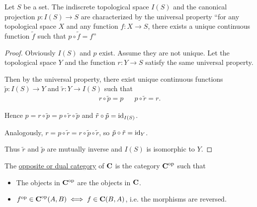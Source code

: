 \begin{example}\label{ex:indiscrete_topology_universal_property}\cite[exercise 0.10]{Leinster2014}
  Let $S$ be a set. The indiscrete topological space $I(S)$ and the canonical projection $p: I(S) \to S$ are characterized by the universal property \enquote{for any topological space $X$ and any function $f: X \to S$, there exists a unique continuous function $\tilde f$ such that $p \circ \tilde f = f$}

  \begin{figure}[ht]
    \center
  \end{figure}
\end{example}
\begin{proof}
  Obviously $I(S)$ and $p$ exist. Assume they are not unique. Let the topological space $Y$ and the function $r: Y \to S$ satisfy the same universal property.

  Then by the universal property, there exist unique continuous functions $\tilde p: I(S) \to Y$ and $\tilde r: Y \to I(S)$ such that
  \begin{align*}
    r \circ \tilde p = p
    &&
    p \circ \tilde r = r.
  \end{align*}

  Hence $p = r \circ \tilde p = p \circ \tilde r \circ \tilde p$ and $\tilde r \circ \tilde p = \operatorname{id}_{I(S)}$.

  Analogously, $r = p \circ \tilde r = r \circ \tilde p \circ \tilde r$, so $\tilde p \circ \tilde r = \operatorname{id}_Y$.

  Thus $\tilde r$ and $\tilde p$ are mutually inverse and $I(S)$ is isomorphic to $Y$.
\end{proof}

\begin{definition}\label{def:opposite_category}\cite[construction 1.1.9]{Leinster2014}
  The \uline{opposite or dual category} of $\operatorname{\mathbf{C}}$ is the category $\operatorname{\mathbf{C}}^{\operatorname{op}}$ such that
  \begin{itemize}
    \item The objects in $\operatorname{\mathbf{C}}^{\operatorname{op}}$ are the objects in $\operatorname{\mathbf{C}}$.
    \item $f^{\operatorname{op}} \in \operatorname{\mathbf{C}}^{\operatorname{op}}(A, B) \iff f \in \operatorname{\mathbf{C}}(B, A)$, i.e. the morphisms are reversed.
  \end{itemize}
\end{definition}

